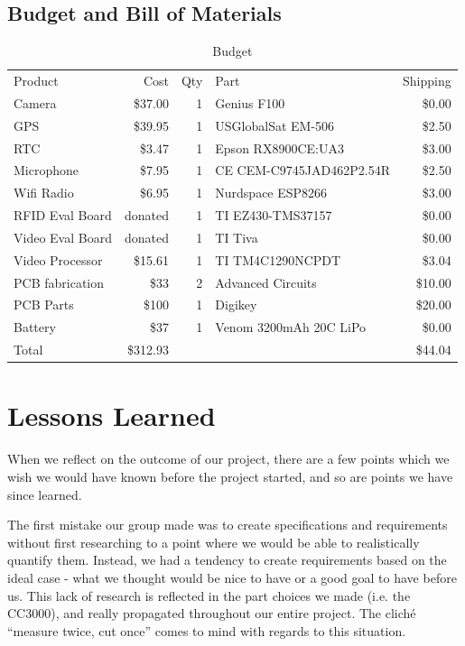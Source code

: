\documentclass[12pt]{article}
\begin{document}
\subsection{Budget and Bill of Materials}

\begin{table}[h!]
    \centering
    \caption{Budget}
    \begin{tabular}{lrrlr}
        Product & Cost & Qty & Part & Shipping\\
        Camera & \$37.00 & 1 & Genius F100 & \$0.00\\
        GPS & \$39.95 & 1 & USGlobalSat EM-506 & \$2.50\\
        RTC & \$3.47 & 1 & Epson RX8900CE:UA3 & \$3.00\\
        Microphone & \$7.95 & 1 & CE CEM-C9745JAD462P2.54R & \$2.50\\
        Wifi Radio & \$6.95 & 1 & Nurdspace ESP8266 & \$3.00\\
        RFID Eval Board & donated & 1 & TI EZ430-TMS37157 & \$0.00\\
        Video Eval Board & donated & 1 & TI Tiva & \$0.00\\
        Video Processor & \$15.61 & 1 & TI TM4C1290NCPDT & \$3.04\\
        PCB fabrication & \$33 & 2 & Advanced Circuits & \$10.00\\
        PCB Parts & \$100 & 1 & Digikey & \$20.00\\
        Battery & \$37 & 1 & Venom 3200mAh 20C LiPo & \$0.00\\
        Total & \$312.93 & & & \$44.04\\
    \end{tabular}
\end{table}

\section{Lessons Learned}
When we reflect on the outcome of our project, there are a few points which we
wish we would have known before the project started, and so are points we have
since learned. 

The first mistake our group made was to create specifications and requirements
without first researching to a point where we would be able to realistically
quantify them. Instead, we had a tendency to create requirements based on the
ideal case - what we thought would be nice to have or a good goal to have
before us. This lack of research is reflected in the part choices we made (i.e.
the CC3000), and really propagated throughout our entire project. The cliché
``measure twice, cut once'' comes to mind with regards to this situation.
\end{document}
